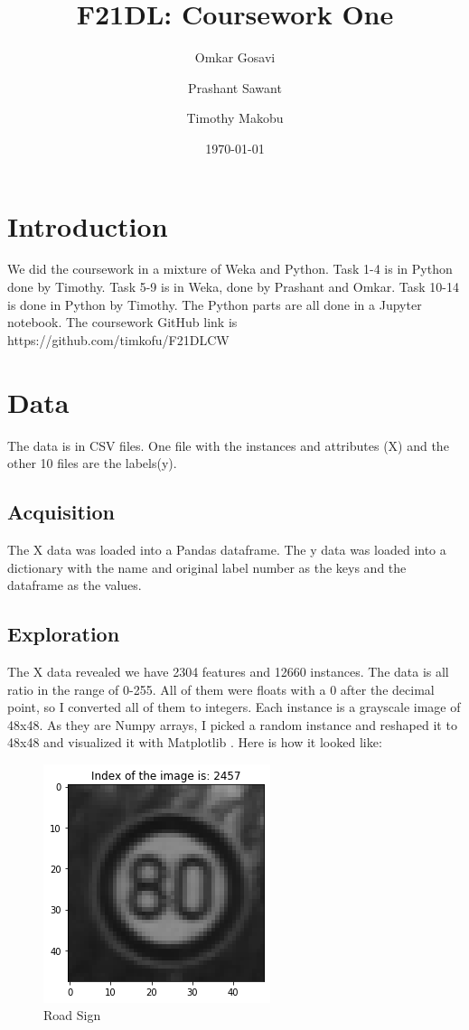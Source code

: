 \documentclass[12pt]{report}
\title{F21DL: Coursework One}
\author{
	Omkar Gosavi
	\and
	Prashant Sawant
	\and
	Timothy Makobu
}
\date{\today}
\begin{document}
\maketitle

\tableofcontents

\section{Introduction}
We did the coursework in a mixture of Weka and Python. Task 1-4 is 
in Python done by Timothy. Task 5-9 is in Weka, done by Prashant 
and Omkar. Task 10-14 is done in Python by Timothy.
The Python parts are all done in a Jupyter  \parencite{jupyter} notebook.
The coursework GitHub link is https://github.com/timkofu/F21DLCW

\section{Data}
The data is in CSV files. One file with the instances 
and attributes (X) and the other 10 files are the labels(y).

\subsection{Acquisition}
The X data was loaded into a Pandas \parencite{pandas} dataframe. The y data was loaded into a dictionary with the name and original label number as the keys and the dataframe as the values.
\subsection{Exploration}
The X data revealed we have 2304 features and 12660 instances. The data is all ratio in the range of 0-255.
All of them were floats with a 0 after the decimal point, so I converted all of them to integers.
Each instance is a grayscale image of 48x48. As they are Numpy \parencite{numpy} arrays, I picked a random instance and reshaped it to 48x48 and visualized it with Matplotlib \parencite{matplotlib}. Here is how it looked like:

\begin{figure}[ht]
  \includegraphics{sign.png}
  \caption{Road Sign}
  \label{fig:readsign}
\end{figure}
\end{document}
